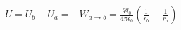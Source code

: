 \documentclass[preview]{standalone}
\begin{document}
\begin{align*}
U = U_b - U_a = -W_{a \rightarrow b} = \frac{q q_0}{4 \pi \epsilon_0} \left( \frac{1}{r_b} - \frac{1}{r_a} \right)
\end{align*}
\end{document}
